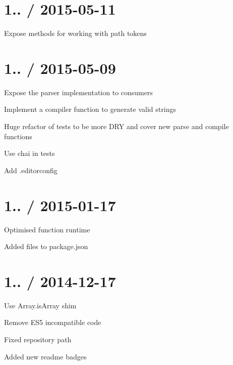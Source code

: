 \section*{1.. / 2015-\/05-\/11 }


\begin{DoxyItemize}
\item Expose methods for working with path tokens
\end{DoxyItemize}

\section*{1.. / 2015-\/05-\/09 }


\begin{DoxyItemize}
\item Expose the parser implementation to consumers
\item Implement a compiler function to generate valid strings
\item Huge refactor of tests to be more D\+RY and cover new parse and compile functions
\item Use chai in tests
\item Add .editorconfig
\end{DoxyItemize}

\section*{1.. / 2015-\/01-\/17 }


\begin{DoxyItemize}
\item Optimised function runtime
\item Added {\ttfamily files} to {\ttfamily package.\+json}
\end{DoxyItemize}

\section*{1.. / 2014-\/12-\/17 }


\begin{DoxyItemize}
\item Use {\ttfamily Array.\+is\+Array} shim
\item Remove E\+S5 incompatible code
\item Fixed repository path
\item Added new readme badges
\end{DoxyItemize}

